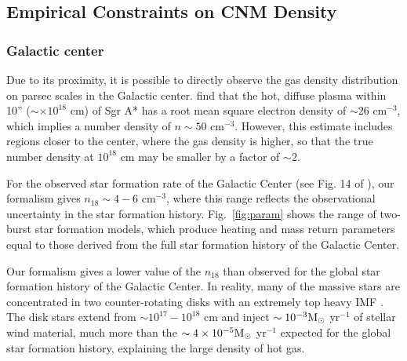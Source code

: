 \documentclass[usenatbib,fleqn]{mnras}
\newcommand{\Msun}{{\rm M_\odot}}
\begin{document}

\subsection{Empirical Constraints on CNM Density}
\label{sec:empirical}

\subsubsection{Galactic center} 
Due to its proximity, it is possible to directly observe the gas
density distribution on parsec scales in the Galactic
center. \citet{Baganoff+2003} find that the hot, diffuse plasma within
10'' ($\sim \times 10^{18}$ cm) of Sgr A* has a root mean square
electron density of $\sim 26$ cm$^{-3}$, which implies a number
density of $n\sim 50$ cm$^{-3}$. However, this estimate
includes regions closer to the center, where the gas density is
higher, so that the true number density at $10^{18}$ cm may be smaller
by a factor of $\sim 2$.

For the observed star formation rate of the Galactic Center (see
Fig. 14 of \citealt{Pfuhl+2011}), our formalism gives $n_{18}\sim 4-6$
cm$^{-3}$, where this range reflects the observational uncertainty in
the star formation history. Fig.~\ref{fig:param} shows the range
of two-burst star formation models, which produce heating and mass
return parameters equal to those derived from the full star formation
history of the Galactic Center. 

Our formalism gives a lower value of the $n_{18}$ than observed for
the global star formation history of the Galactic Center. In reality,
many of the massive stars are concentrated in two counter-rotating
disks \citep{Genzel+2003} with an extremely top heavy IMF
\citep{Bartko+2003}. The disk stars extend from $\sim 10^{17}-10^{18}$
cm and inject $\sim 10^{-3} \Msun$ yr$^{-1}$ of stellar wind
material, much more than the $\sim 4 \times 10^{-5} \Msun$ yr$^{-1}$
expected for the global star formation history, explaining the
large density of hot gas.
\end{document}
